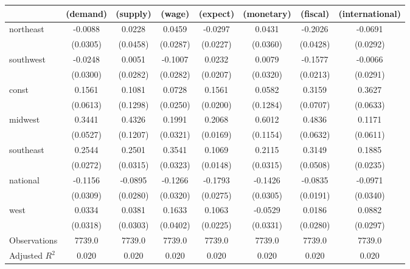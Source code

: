 \begin{tabular}{lccccccc}
\toprule
 & (demand) & (supply) & (wage) & (expect) & (monetary) & (fiscal) & (international) \\
\midrule
northeast & -0.0088 & 0.0228 & 0.0459 & -0.0297 & 0.0431 & -0.2026 & -0.0691 \\
\vspace{0.2cm}
 & (0.0305) & (0.0458) & (0.0287) & (0.0227) & (0.0360) & (0.0428) & (0.0292) \\
southwest & -0.0248 & 0.0051 & -0.1007 & 0.0232 & 0.0079 & -0.1577 & -0.0066 \\
\vspace{0.2cm}
 & (0.0300) & (0.0282) & (0.0282) & (0.0207) & (0.0320) & (0.0213) & (0.0291) \\
const & 0.1561 & 0.1081 & 0.0728 & 0.1561 & 0.0582 & 0.3159 & 0.3627 \\
\vspace{0.2cm}
 & (0.0613) & (0.1298) & (0.0250) & (0.0200) & (0.1284) & (0.0707) & (0.0633) \\
midwest & 0.3441 & 0.4326 & 0.1991 & 0.2068 & 0.6012 & 0.4836 & 0.1171 \\
\vspace{0.2cm}
 & (0.0527) & (0.1207) & (0.0321) & (0.0169) & (0.1154) & (0.0632) & (0.0611) \\
southeast & 0.2544 & 0.2501 & 0.3541 & 0.1069 & 0.2115 & 0.3149 & 0.1885 \\
\vspace{0.2cm}
 & (0.0272) & (0.0315) & (0.0323) & (0.0148) & (0.0315) & (0.0508) & (0.0235) \\
national & -0.1156 & -0.0895 & -0.1266 & -0.1793 & -0.1426 & -0.0835 & -0.0971 \\
\vspace{0.2cm}
 & (0.0309) & (0.0280) & (0.0320) & (0.0275) & (0.0305) & (0.0191) & (0.0340) \\
west & 0.0334 & 0.0381 & 0.1633 & 0.1063 & -0.0529 & 0.0186 & 0.0882 \\
\vspace{0.2cm}
 & (0.0318) & (0.0303) & (0.0402) & (0.0225) & (0.0331) & (0.0280) & (0.0297) \\
\midrule
Observations & 7739.0 & 7739.0 & 7739.0 & 7739.0 & 7739.0 & 7739.0 & 7739.0 \\
Adjusted $R^2$ & 0.020 & 0.020 & 0.020 & 0.020 & 0.020 & 0.020 & 0.020 \\
\bottomrule
\end{tabular}